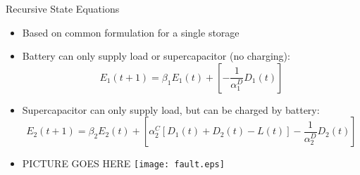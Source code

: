 \documentclass{beamer}
\begin{document}
\begin{frame}{Recursive State Equations}
\begin{itemize}
	\item Based on common formulation for a single storage %
	\item Battery can only supply load or supercapacitor (no charging):
	\begin{equation}\label{eq:StateEq1}E_{1}(t+1)=\beta_{1}E_{1}(t)+\left[-\frac{1}{\alpha_{1}^{D}}D_{1}(t)\right] \end{equation}
	\item Supercapacitor can only supply load, but can be charged by battery:
	\begin{equation}\label{eq:DPStateEq2}E_{2}(t+1)=\beta_{2}E_{2}(t)+\left[\alpha_{2}^{C}[D_{1}(t)+D_{2}(t)-L(t)]-\frac{1}{\alpha_{2}^{D}}D_{2}(t)\right]\end{equation}
	\item PICTURE GOES HERE
	\texttt{[image: fault.eps]}
\end{itemize}
\end{frame}
\end{document}
